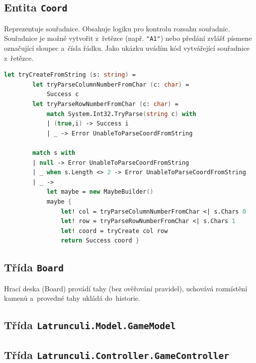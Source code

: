 \documentclass[12pt]{article}
\begin{document}
\subsection{Entita \texttt{Coord}}
Reprezentuje souřadnice. Obsahuje logiku pro kontrolu rozsahu souřadnic. Souřadnice je možné vytvořit z~řetězce (např. \texttt{"A1"}) nebo předání zvlášť písmene označující sloupec a~čísla řádku.
Jako ukázku uvádím kód vytvářející souřadnice z~řetězce.
\begin{lstlisting}[language=FSharp]
    let tryCreateFromString (s: string) =
        let tryParseColumnNumberFromChar (c: char) =
            Success c
        let tryParseRowNumberFromChar (c: char) =
            match System.Int32.TryParse(string c) with
            | (true,i) -> Success i
            | _ -> Error UnableToParseCoordFromString     
                               
        match s with
        | null -> Error UnableToParseCoordFromString
        | _ when s.Length <> 2 -> Error UnableToParseCoordFromString
        | _ -> 
            let maybe = new MaybeBuilder()
            maybe {
                let! col = tryParseColumnNumberFromChar <| s.Chars 0
                let! row = tryParseRowNumberFromChar <| s.Chars 1
                let! coord = tryCreate col row
                return Success coord }
\end{lstlisting}

\subsection{Třída \texttt{Board}}
Hrací deska (Board) provádí tahy (bez ověřování pravidel), uchovává rozmístění kamenů a~provedné tahy ukládá do~historie.

\subsection{Třída \texttt{Latrunculi.Model.GameModel}}

\subsection{Třída \texttt{Latrunculi.Controller.GameController}}
\end{document}

